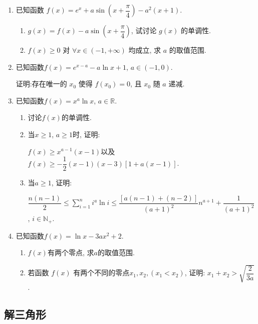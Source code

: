 \documentclass[12pt, a4paper, oneside]{ctexart}
\begin{document}
\begin{enumerate}[leftmargin=*]
    \item 已知函数 $f(x)=e^x + a \sin \left( x + \dfrac{\pi}{4} \right) - a^2 (x+1)$.
          \begin{enumerate}
              \item $g(x)=f(x) - a \sin \left( x + \dfrac{\pi}{4} \right)$, 试讨论 $g(x)$ 的单调性.
              \item $f(x) \geq 0$ 对 $\forall x \in (-1, +\infty)$ 均成立, 求 $a$ 的取值范围.
          \end{enumerate}
          \vspace*{2\baselineskip}
    \item 已知函数$f(x)=e^{x-a} - a \ln x + 1$, $a \in (-1, 0)$.
    
    证明:存在唯一的 $x_0$ 使得 $f(x_0) = 0$, 且 $x_0$ 随 $a$ 递减.
          \vspace*{2\baselineskip}
    \item 已知函数$f(x)=x^a\ln x$, $a\in \mathbb{R} $.
          \begin{enumerate}
              \item 讨论$f(x)$的单调性.
              \item 当$x\geqslant 1$, $a\geqslant 1$时, 证明:

                    $f(x)\geqslant x^{a-1}(x-1)$以及$f(x)\geqslant -\dfrac{1}{2}(x-1)(x-3)[1+a(x-1)]$.
              \item 当$a\geqslant 1$, 证明:

                    $\dfrac{n(n-1)}{2}\leqslant \sum_{i=1}^{n} i^a \ln i \leqslant \dfrac{[a(n-1)+(n-2)]}{(a+1)^2}n^{a+1} +\dfrac{1}{(a+1)^2}$, $i\in \mathbb{N} _+$.
          \end{enumerate}
          \vspace*{2\baselineskip}
    \item 已知函数$f(x)=\ln x-3ax^2+2$.
          \begin{enumerate}
              \item $f(x)$有两个零点, 求$a$的取值范围.
              \item 若函数 $f(x)$ 有两个不同的零点$x_1, x_2, (x_1<x_2)$, 证明: $x_1+x_2>\sqrt{\dfrac{2}{3a}} $.
          \end{enumerate}
\end{enumerate}

\subsection{解三角形}
\end{document}
